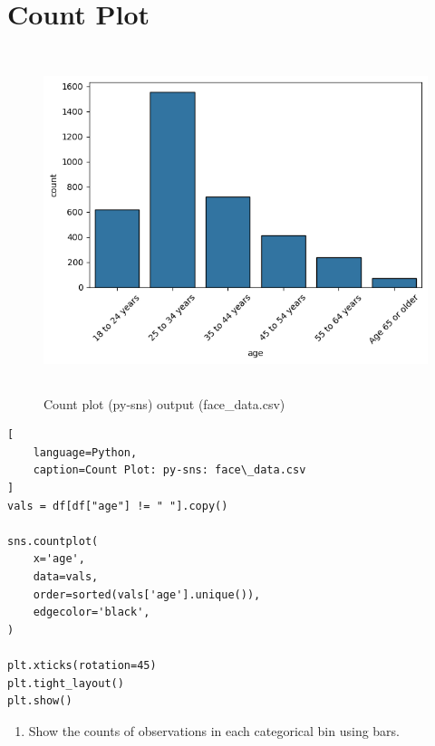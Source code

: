 \section{Count Plot \cite{data/online/seaborn.countplot}} \label{Visualizing Data/Count Plot}


\begin{table}[H]
\begin{minipage}[t]{0.35\linewidth}
\begin{figure}[H]
    \centering
    \includegraphics[width=0.9\linewidth, height=10cm, keepaspectratio]{images/data/__visualizations__/sns-countplot-face-data.png}
    \caption{Count plot (py-sns) output (face\_data.csv)}
\end{figure}
\end{minipage}
\hspace{0.2cm}
\vrule width 1pt
\hspace{0.5cm}
\begin{minipage}[t]{0.57\linewidth}
\begin{lstlisting}[
    language=Python,
    caption=Count Plot: py-sns: face\_data.csv
]
vals = df[df["age"] != " "].copy()

sns.countplot(
    x='age', 
    data=vals, 
    order=sorted(vals['age'].unique()), 
    edgecolor='black',
)

plt.xticks(rotation=45)
plt.tight_layout()
plt.show()
\end{lstlisting}
\end{minipage}
\end{table}

\vspace{0.3cm}

\begin{enumerate}
    \item Show the counts of observations in each categorical bin using bars.

    
\end{enumerate}

